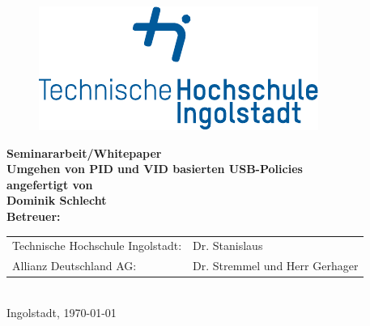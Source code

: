 
\begin{titlepage}

\phantom{tmpText}

\vspace{1cm}

\begin{figure}[h!]
\centering
\includegraphics[width=\textwidth]{bilder/thi_logo_cropped.pdf}
\end{figure}

  \begin{center}

    
    
    \textbf{{\large Seminararbeit/Whitepaper} \\[3ex]
    {\LARGE Umgehen von PID und VID basierten USB-Policies} \\[1ex]
    \vfill
    angefertigt von \\
    Dominik Schlecht \\[2ex] %
    \vfill
    Betreuer:} \\%
    \begin{tabular}{ll}
      Technische Hochschule Ingolstadt: & Dr. Stanislaus \\
      Allianz Deutschland AG: & Dr. Stremmel und Herr Gerhager
    \end{tabular} \\[2ex]
    \vfill
    Ingolstadt, \today
  \end{center}
\end{titlepage}
